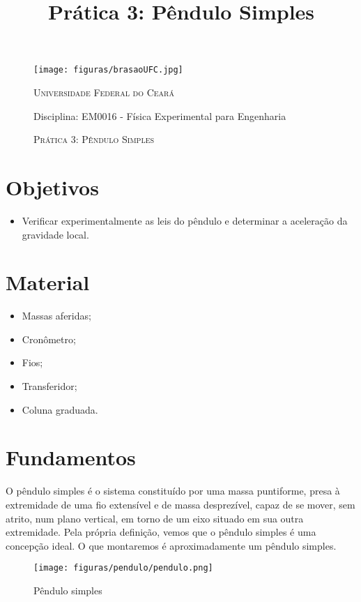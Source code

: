 \documentclass[10pt,a4paper,onecolumn,notitlepage]{scrartcl}
\author{}
\title{Prática 3: Pêndulo Simples}
\begin{document}
\thispagestyle{myheadings}

\begin{figure}
\begin{minipage}{0.08\linewidth}
\texttt{[image: figuras/brasaoUFC.jpg]} 
\end{minipage}
\begin{minipage}{0.91\linewidth}
\textsc{Universidade Federal do Ceará}

Disciplina: EM0016 - Física Experimental para Engenharia
\end{minipage}

\begin{minipage}{\linewidth}
\centering
\textsc{Prática 3: Pêndulo Simples}
\\
\hrulefill %
\end{minipage}
\end{figure}

\section{Objetivos}

\begin{itemize}
\item Verificar experimentalmente as leis do pêndulo  e  determinar a aceleração da gravidade local.
\end{itemize}

\section{Material}

\begin{multicols}{3}
\begin{itemize}
\item Massas  aferidas;
\item Cronômetro;
\item Fios;
\item Transferidor;
\item Coluna graduada.
\end{itemize}
\end{multicols}

\section{Fundamentos}
O pêndulo simples é o sistema constituído por uma massa puntiforme, presa à extremidade de uma fio extensível e de massa desprezível, capaz de se mover, sem atrito, num plano vertical, em torno de um eixo situado em sua outra extremidade. Pela própria definição, vemos que o pêndulo simples é uma concepção ideal. O que montaremos é aproximadamente um pêndulo simples.
\begin{figure}[ht]
\centering
\texttt{[image: figuras/pendulo/pendulo.png]} 
\caption{Pêndulo simples}
\label{fig:pendulo}
\end{figure}
\end{document}
